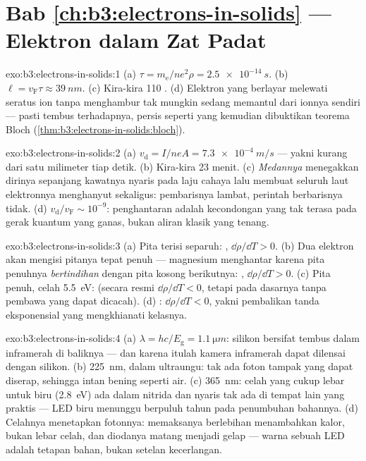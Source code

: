 \section*{Bab \ref{ch:b3:electrons-in-solids} --- Elektron dalam Zat Padat}

\begin{solution}{exo:b3:electrons-in-solids:1}
(a) $\tau = m_{\text{e}}/ne^2\rho = \qty{2.5e-14}{s}$. (b) $\ell =
v_{\text{F}}\tau \approx \qty{39}{nm}$. (c) Kira-kira 110 . (d) Elektron yang berlayar melewati seratus ion tanpa
menghambur tak mungkin sedang memantul dari ionnya sendiri --- 
pasti tembus terhadapnya, persis seperti yang kemudian dibuktikan
teorema Bloch (\cref{thm:b3:electrons-in-solids:bloch}).
\end{solution}

\begin{solution}{exo:b3:electrons-in-solids:2}
(a) $v_{\text{d}} = I/neA = \qty{7.3e-4}{m/s}$ --- yakni kurang dari
satu milimeter tiap detik. (b) Kira-kira 23 menit. (c) \emph{Medannya}
menegakkan dirinya sepanjang kawatnya nyaris pada laju cahaya lalu
membuat seluruh laut elektronnya menghanyut sekaligus: pembarisnya
lambat, perintah berbarisnya tidak. (d) $v_{\text{d}}/v_{\text{F}} \sim
10^{-9}$: penghantaran adalah kecondongan yang tak terasa pada gerak
kuantum yang ganas, bukan aliran klasik yang tenang.
\end{solution}

\begin{solution}{exo:b3:electrons-in-solids:3}
(a) Pita terisi separuh: , $\dd\rho/\dd T > 0$. (b) Dua
elektron akan mengisi pitanya tepat penuh --- magnesium menghantar
karena pita penuhnya \emph{bertindihan} dengan pita kosong berikutnya: ,
$\dd\rho/\dd T > 0$. (c) Pita penuh, celah \qty{5.5}{eV}: 
(secara resmi $\dd\rho/\dd T < 0$, tetapi pada dasarnya tanpa pembawa
yang dapat dicacah). (d) : $\dd\rho/\dd T < 0$, yakni
pembalikan tanda eksponensial yang mengkhianati kelasnya.
\end{solution}

\begin{solution}{exo:b3:electrons-in-solids:4}
(a) $\lambda = hc/E_{\text{g}} = \qty{1.1}{\micro m}$: silikon bersifat
tembus dalam inframerah di baliknya --- dan karena itulah kamera
inframerah dapat dilensai dengan silikon. (b) \qty{225}{nm}, dalam
ultraungu: tak ada foton tampak yang dapat diserap, sehingga intan
bening seperti air. (c) \qty{365}{nm}: celah yang cukup lebar untuk biru
(\qty{2.8}{eV}) ada dalam nitrida dan nyaris tak ada di tempat lain
yang praktis --- LED biru menunggu berpuluh tahun pada penumbuhan bahannya.
(d) Celahnya menetapkan fotonnya: memaksanya berlebihan menambahkan kalor,
bukan lebar celah, dan diodanya matang menjadi gelap --- warna sebuah LED
adalah tetapan bahan, bukan setelan kecerlangan.
\end{solution}

